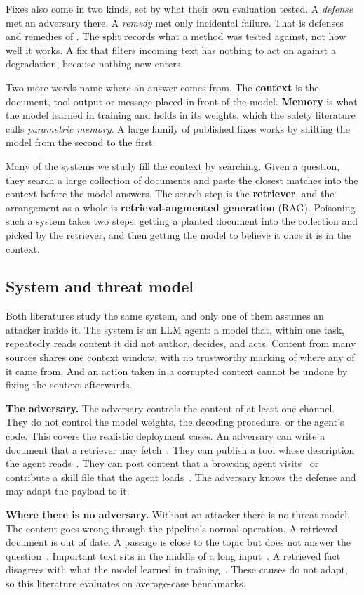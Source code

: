 Fixes also come in two kinds, set by what their own evaluation tested. A \emph{defense} met an
adversary there. A \emph{remedy} met only incidental failure. That is
\NDefenseFix{} defenses and \NRemedy{} remedies of \NFixes{}. The split
records what a method was tested against, not how well it works. A fix that
filters incoming text has nothing to act on against a degradation, because
nothing new enters.

Two more words name where an answer comes from. The \textbf{context} is the document, tool
output or message placed in front of the model. \textbf{Memory} is what the
model learned in training and holds in its weights, which the safety
literature calls \emph{parametric memory}. A large family of published
fixes works by shifting the model from the second to the first.

Many of the systems we study fill the context by searching. Given a
question, they search a large collection of documents and paste the closest
matches into the context before the model answers. The search step is the
\textbf{retriever}, and the arrangement as a whole is
\textbf{retrieval-augmented generation} (RAG). Poisoning such a system takes
two steps: getting a planted document into the collection and picked by the
retriever, and then getting the model to believe it once it is in the context.

\subsection{System and threat model}
\label{sec:securityregime}

Both literatures study the same system, and only one of them assumes an
attacker inside it. The system is an LLM agent: a model that, within one task, repeatedly reads
content it did not author, decides, and acts. Content from many sources shares one context window, with
no trustworthy marking of where any of it came from. And an action taken in a corrupted context cannot be undone by fixing
the context afterwards.

\textbf{The adversary.} The adversary controls the content of at least one channel. They do not
control the model weights, the decoding procedure, or the agent's code. This covers the realistic
deployment cases. An adversary can write a document that a retriever may
fetch~\cite{zou-2024-poisonedrag}. They can publish a tool whose description
the agent reads~\cite{shi-2025-prompt}. They can post content that a browsing
agent visits~\cite{greshake-2023-not} or contribute a skill file that the
agent loads~\cite{schmotz-2025-agent}. The adversary knows the defense and
may adapt the payload to it.

\textbf{Where there is no adversary.} Without an attacker there is no threat
model. The content goes wrong through the pipeline's normal operation. A retrieved document is out of date. A passage is close to the topic but
does not answer the question~\cite{shi-2023-large}. Important text sits in
the middle of a long input~\cite{liu-2023-lost}. A retrieved fact disagrees
with what the model learned in training~\cite{xu-2024-knowledge}. These causes do not adapt, so this literature evaluates on
average-case benchmarks.

